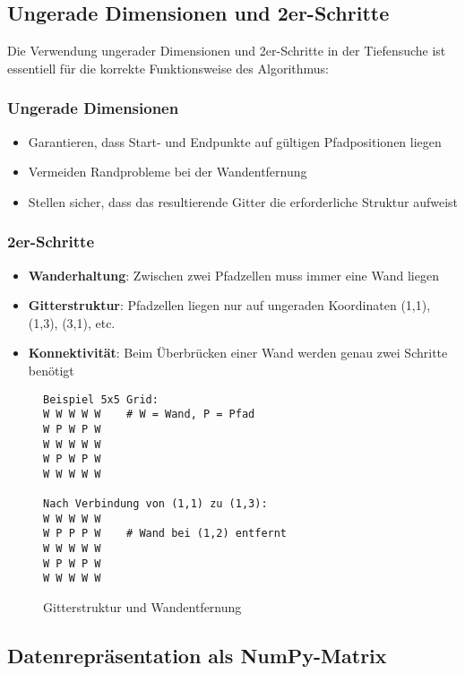 \documentclass[12pt,a4paper]{article}
\begin{document}
\subsection{Ungerade Dimensionen und 2er-Schritte}

Die Verwendung ungerader Dimensionen und 2er-Schritte in der Tiefensuche ist essentiell für die korrekte Funktionsweise des Algorithmus:

\subsubsection{Ungerade Dimensionen}
\begin{itemize}
    \item Garantieren, dass Start- und Endpunkte auf gültigen Pfadpositionen liegen
    \item Vermeiden Randprobleme bei der Wandentfernung
    \item Stellen sicher, dass das resultierende Gitter die erforderliche Struktur aufweist
\end{itemize}

\subsubsection{2er-Schritte}
\begin{itemize}
    \item \textbf{Wanderhaltung}: Zwischen zwei Pfadzellen muss immer eine Wand liegen
    \item \textbf{Gitterstruktur}: Pfadzellen liegen nur auf ungeraden Koordinaten (1,1), (1,3), (3,1), etc.
    \item \textbf{Konnektivität}: Beim Überbrücken einer Wand werden genau zwei Schritte benötigt
\end{itemize}

\begin{figure}[H]
\centering
\begin{verbatim}
Beispiel 5x5 Grid:
W W W W W    # W = Wand, P = Pfad
W P W P W
W W W W W
W P W P W
W W W W W

Nach Verbindung von (1,1) zu (1,3):
W W W W W
W P P P W    # Wand bei (1,2) entfernt
W W W W W
W P W P W
W W W W W
\end{verbatim}
\caption{Gitterstruktur und Wandentfernung}
\end{figure}

\subsection{Datenrepräsentation als NumPy-Matrix}
\end{document}
